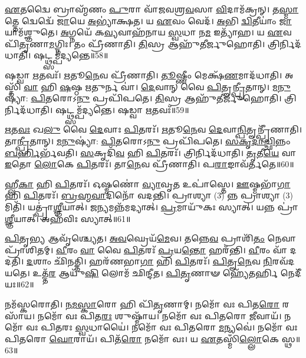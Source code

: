 \-\ul{𑌏}\-𑌤𑌦𑍍𑌵𑍈 𑌬𑍍𑌰𑌾𑌹𑍍𑌮᳴𑌣𑌂 \ul{𑌪𑍁}\-𑌰𑌾 𑌵𑌾᳴𑌜𑌵𑌶𑍍𑌰\-\ul{𑌵}\-𑌸𑌾 \ul{𑌵𑌿}\-𑌦𑌾𑌮᳴𑌕𑍍𑌰𑌨𑍍।
𑌤\-\ul{𑌸𑍍𑌮𑌾}\-𑌤𑍍𑌤𑍇 𑌦𑍍𑌵𑍇𑌦𑍍𑌵𑍇᳴ \ul{𑌜𑌾}\-𑌯𑍇 \ul{𑌅}\-𑌭𑍍𑌯𑌾॑𑌕𑍍𑌷𑌤।
𑌯 \ul{𑌏}\-𑌵𑌂 𑌵𑍇𑌦᳴।
\-\ul{𑌅}\-𑌭𑌿 \ul{𑌦𑍍𑌵𑌿}\-𑌤𑍀𑌯𑌾𑌂॑ \ul{𑌜𑌾}\-𑌯𑌾𑌮᳴𑌶𑍍𑌞𑍁𑌤𑍇।
\-\ul{𑌅}\-𑌗𑍍𑌨𑌯𑍇᳴ 𑌕\-\ul{𑌵𑍍𑌯}\-𑌵𑌾𑌹᳴𑌨𑌾𑌯 \ul{𑌸𑍍𑌵}\-𑌧𑌾 𑌨\-\ul{𑌮} 𑌇𑌤𑍍𑌯𑌾᳴𑌹।
𑌯 \ul{𑌏}\-𑌵 𑌪𑌿᳴\-\ul{𑌤𑍃}\-𑌣𑌾\-\ul{𑌮}\-𑌗𑍍𑌨𑌿𑌃।
𑌤𑌂 𑌪𑍍𑌰𑍀᳴𑌣𑌾𑌤𑌿।
\-\ul{𑌤𑌿}\-𑌸𑍍𑌰 𑌆𑌹𑍁᳴𑌤𑍀𑌰𑍍𑌜𑍁𑌹𑍋𑌤𑌿।
𑌤𑍍𑌰𑌿𑌰𑍍𑌨𑌿𑌦᳴𑌧𑌾𑌤𑌿।
𑌷𑌟𑍍𑌥𑍍𑌸𑌮𑍍𑌪᳴𑌦𑍍𑌯𑌨𑍍𑌤𑍇॥58॥

𑌷𑌡𑍍𑌵𑌾 \ul{𑌋}\-𑌤𑌵𑌃᳴।
\-\ul{𑌋}\-𑌤𑍂\-\ul{𑌨𑍇}\-𑌵 𑌪𑍍𑌰𑍀᳴𑌣𑌾𑌤𑌿।
\-\ul{𑌤𑍂}\-𑌷𑍍𑌣𑍀𑌂 𑌮𑍇𑌕𑍍𑌷᳴\-\ul{𑌣}\-𑌮𑌾𑌦᳴𑌧𑌾𑌤𑌿।
𑌅𑌸𑍍𑌤𑌿᳴ \ul{𑌵𑌾} 𑌹𑌿 \ul{𑌷}\-𑌷𑍍𑌠 \ul{𑌋}\-𑌤𑍁𑌰𑍍𑌨 𑌵𑌾॑।
\-\ul{𑌦𑍇}\-𑌵𑌾𑌨𑍍 𑌵𑍈 \ul{𑌪𑌿}\-𑌤𑍄\-\ul{𑌨𑍍𑌪𑍍𑌰𑍀}\-𑌤𑌾𑌨𑍍।
\-\ul{𑌮}\-\-\ul{𑌨𑍁}\-𑌷𑍍𑌯𑌾॑: \ul{𑌪𑌿}\-𑌤𑌰𑍋𑌽\-\ul{𑌨𑍁} 𑌪𑍍𑌰𑌪𑌿᳴𑌪𑌤𑍇।
\-\ul{𑌤𑌿}\-𑌸𑍍𑌰 𑌆𑌹𑍁᳴𑌤𑍀𑌰𑍍𑌜𑍁𑌹𑍋𑌤𑌿।
𑌤𑍍𑌰𑌿𑌰𑍍𑌨𑌿𑌦᳴𑌧𑌾𑌤𑌿।
𑌷𑌟𑍍𑌥𑍍𑌸𑌮𑍍𑌪᳴𑌦𑍍𑌯𑌨𑍍𑌤𑍇।
𑌷𑌡𑍍𑌵𑌾 \ul{𑌋}\-𑌤𑌵𑌃᳴॥59॥

\-\ul{𑌋}\-𑌤\-\ul{𑌵𑌃} 𑌖\-\ul{𑌲𑍁} 𑌵𑍈 \ul{𑌦𑍇}\-𑌵𑌾𑌃 \ul{𑌪𑌿}\-𑌤𑌰𑌃᳴।
\-\ul{𑌋}\-𑌤𑍂\-\ul{𑌨𑍇}\-𑌵 \ul{𑌦𑍇}\-𑌵𑌾\-\ul{𑌨𑍍𑌪𑌿}\-𑌤𑍄𑌨𑍍𑌪𑍍𑌰𑍀᳴𑌣𑌾𑌤𑌿।
𑌤𑌾\-\ul{𑌨𑍍𑌪𑍍𑌰𑍀}\-𑌤𑌾𑌨𑍍।
\-\ul{𑌮}\-\-\ul{𑌨𑍁}\-𑌷𑍍𑌯𑌾॑: \ul{𑌪𑌿}\-𑌤𑌰𑍋𑌽\-\ul{𑌨𑍁} 𑌪𑍍𑌰𑌪𑌿᳴𑌪𑌤𑍇।
\-\ul{𑌸}\-\-\ul{𑌕𑍃}\-\-\ul{𑌦𑌾}\-\-\ul{𑌚𑍍𑌛𑌿}\-𑌨𑍍𑌨𑌂 \ul{𑌬}\-\-\ul{𑌰𑍍}\-\mbox{}𑌹𑌿𑌰𑍍𑌭᳴𑌵𑌤𑌿।
\-\ul{𑌸}\-𑌕𑍃𑌦𑌿᳴\-\ul{𑌵} 𑌹𑌿 \ul{𑌪𑌿}\-𑌤𑌰𑌃᳴।
𑌤𑍍𑌰𑌿𑌰𑍍𑌨𑌿𑌦᳴𑌧𑌾𑌤𑌿।
\-\ul{𑌤𑍃}\-𑌤𑍀\-\ul{𑌯𑍇} 𑌵𑌾 \ul{𑌇}\-𑌤𑍋 \ul{𑌲𑍋}\-𑌕𑍇 \ul{𑌪𑌿}\-𑌤𑌰𑌃᳴।
𑌤𑌾\-\ul{𑌨𑍇}\-𑌵 𑌪𑍍𑌰𑍀᳴𑌣𑌾𑌤𑌿।
𑌪\-\ul{𑌰𑌾}\-𑌙𑌾𑌵᳴𑌰𑍍𑌤𑌤𑍇॥60॥

𑌹𑍍𑌲𑍀\-\ul{𑌕𑌾} 𑌹𑌿 \ul{𑌪𑌿}\-𑌤𑌰𑌃᳴।
𑌓𑌷𑍍𑌮𑌣𑍋॑ \ul{𑌵𑍍𑌯𑌾}\-𑌵𑍃\-\ul{𑌤} 𑌉𑌪𑌾॑𑌸𑍍𑌤𑍇।
\-\ul{𑌊}\-𑌷𑍍𑌮𑌭𑌾᳴\-\ul{𑌗𑌾} 𑌹𑌿 \ul{𑌪𑌿}\-𑌤𑌰𑌃᳴।
\-\ul{𑌬𑍍𑌰}\-\-\ul{𑌹𑍍𑌮}\-\-\ul{𑌵𑌾}\-𑌦𑌿𑌨𑍋᳴ 𑌵𑌦𑌨𑍍𑌤𑌿।
𑌪𑍍𑌰𑌾𑌶𑍍𑌯𑌾 (3) 𑌨𑍍𑌨 𑌪𑍍𑌰𑌾𑌶𑍍𑌯𑌾 (3) 𑌮𑌿𑌤𑌿᳴।
𑌯𑌤𑍍𑌪𑍍𑌰𑌾॑\-\ul{𑌶𑍍𑌞𑍀}\-𑌯𑌾𑌤𑍍।
𑌜\-\ul{𑌨𑍍𑌯}\-𑌮𑌨𑍍𑌨᳴𑌮𑌦𑍍𑌯𑌾𑌤𑍍।
\-\ul{𑌪𑍍𑌰}\-𑌮𑌾𑌯𑍁᳴𑌕𑌃 𑌸𑍍𑌯𑌾𑌤𑍍।
𑌯𑌨𑍍𑌨 𑌪𑍍𑌰𑌾॑\-\ul{𑌶𑍍𑌞𑍀}\-𑌯𑌾𑌤𑍍।
𑌅𑌹᳴𑌵𑌿𑌃 𑌸𑍍𑌯𑌾𑌤𑍍॥61॥

\-\ul{𑌪𑌿}\-𑌤𑍃\-\ul{𑌭𑍍𑌯} 𑌆𑌵𑍃᳴𑌶𑍍𑌚𑍍𑌯𑍇𑌤।
\-\ul{𑌅}\-\-\ul{𑌵}\-𑌘𑍍𑌰𑍇𑌯᳴\-\ul{𑌮𑍇}\-𑌵।
𑌤𑌨𑍍𑌨𑍇\-\ul{𑌵} 𑌪𑍍𑌰𑌾𑌶𑌿᳴\-\ul{𑌤𑌂} 𑌨𑍇𑌵𑌾𑌪𑍍𑌰𑌾᳴𑌶𑌿𑌤𑌮𑍍।
\-\ul{𑌵𑍀}\-𑌰𑌂 \ul{𑌵𑌾} 𑌵𑍈 \ul{𑌪𑌿}\-𑌤𑌰𑌃᳴ \ul{𑌪𑍍𑌰}\-𑌯\-\ul{𑌨𑍍𑌤𑍋} 𑌹𑌰᳴𑌨𑍍𑌤𑌿।
\-\ul{𑌵𑍀}\-𑌰𑌂 𑌵𑌾᳴ 𑌦𑌦𑌤𑌿।
\-\ul{𑌦}\-𑌶𑌾𑌂 𑌛𑌿᳴𑌨𑌤𑍍𑌤𑌿।
𑌹𑌰᳴𑌣𑌭𑌾\-\ul{𑌗𑌾} 𑌹𑌿 \ul{𑌪𑌿}\-𑌤𑌰𑌃᳴।
\-\ul{𑌪𑌿}\-𑌤𑍄\-\ul{𑌨𑍇}\-𑌵 \ul{𑌨𑌿}\-𑌰𑌵᳴𑌦𑌯𑌤𑍇।
𑌉𑌤𑍍𑌤᳴\-\ul{𑌰} 𑌆𑌯𑍁᳴\-\ul{𑌷𑌿} 𑌲𑍋𑌮᳴ 𑌛𑌿𑌨𑍍𑌦𑍀𑌤।
\-\ul{𑌪𑌿}\-\-\ul{𑌤𑍃}\-𑌣𑌾𑍟 𑌹𑍍𑌯𑍇᳴𑌤𑌰𑍍\mbox{}\-\ul{𑌹𑌿} 𑌨𑍇𑌦𑍀᳴𑌯𑌃॥62॥

𑌨𑌮᳴𑌸𑍍𑌕𑌰𑍋𑌤𑌿।
\-\ul{𑌨}\-\-\ul{𑌮}\-\-\ul{𑌸𑍍𑌕𑌾}\-𑌰𑍋 𑌹𑌿 𑌪𑌿᳴\-\ul{𑌤𑍃}\-𑌣𑌾𑌮𑍍।
𑌨𑌮𑍋᳴ 𑌵𑌃 𑌪𑌿𑌤\-\ul{𑌰𑍋} 𑌰𑌸𑌾᳴𑌯।
𑌨𑌮𑍋᳴ 𑌵𑌃 𑌪𑌿𑌤\-\ul{𑌰𑌃} 𑌶𑍁𑌷𑍍𑌮𑌾᳴𑌯।
𑌨𑌮𑍋᳴ 𑌵𑌃 𑌪𑌿𑌤𑌰𑍋 \ul{𑌜𑍀}\-𑌵𑌾𑌯᳴।
𑌨𑌮𑍋᳴ 𑌵𑌃 𑌪𑌿𑌤𑌰𑌃 \ul{𑌸𑍍𑌵}\-𑌧𑌾𑌯𑍈॑।
𑌨𑌮𑍋᳴ 𑌵𑌃 𑌪𑌿𑌤𑌰𑍋 \ul{𑌮}\-𑌨𑍍𑌯𑌵𑍇॑।
𑌨𑌮𑍋᳴ 𑌵𑌃 𑌪𑌿𑌤𑌰𑍋 \ul{𑌘𑍋}\-𑌰𑌾𑌯᳴।
𑌪𑌿𑌤᳴\-\ul{𑌰𑍋} 𑌨𑌮𑍋᳴ 𑌵𑌃।
𑌯 \ul{𑌏}\-𑌤𑌸𑍍𑌮𑌿𑌁᳴\-\ul{𑌲𑍍𑌲𑍋}\-𑌕𑍇 𑌸𑍍𑌥॥63॥

